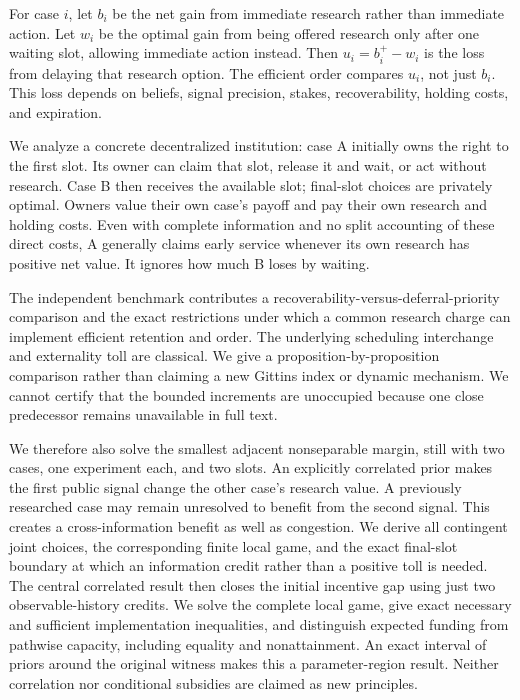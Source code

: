 \documentclass[
  11pt,
]{article}
\begin{document}
For case \(i\), let \(b_i\) be the net gain from immediate research
rather than immediate action. Let \(w_i\) be the optimal gain from being
offered research only after one waiting slot, allowing immediate action
instead. Then \(u_i=b_i^+-w_i\) is the loss from delaying that research
option. The efficient order compares \(u_i\), not just \(b_i\). This
loss depends on beliefs, signal precision, stakes, recoverability,
holding costs, and expiration.

We analyze a concrete decentralized institution: case A initially owns
the right to the first slot. Its owner can claim that slot, release it
and wait, or act without research. Case B then receives the available
slot; final-slot choices are privately optimal. Owners value their own
case's payoff and pay their own research and holding costs. Even with
complete information and no split accounting of these direct costs, A
generally claims early service whenever its own research has positive
net value. It ignores how much B loses by waiting.

The independent benchmark contributes a
recoverability-versus-deferral-priority comparison and the exact
restrictions under which a common research charge can implement
efficient retention and order. The underlying scheduling interchange and
externality toll are classical. We give a proposition-by-proposition
comparison rather than claiming a new Gittins index or dynamic
mechanism. We cannot certify that the bounded increments are unoccupied
because one close predecessor remains unavailable in full text.

We therefore also solve the smallest adjacent nonseparable margin, still
with two cases, one experiment each, and two slots. An explicitly
correlated prior makes the first public signal change the other case's
research value. A previously researched case may remain unresolved to
benefit from the second signal. This creates a cross-information benefit
as well as congestion. We derive all contingent joint choices, the
corresponding finite local game, and the exact final-slot boundary at
which an information credit rather than a positive toll is needed. The
central correlated result then closes the initial incentive gap using
just two observable-history credits. We solve the complete local game,
give exact necessary and sufficient implementation inequalities, and
distinguish expected funding from pathwise capacity, including equality
and nonattainment. An exact interval of priors around the original
witness makes this a parameter-region result. Neither correlation nor
conditional subsidies are claimed as new principles.
\end{document}

